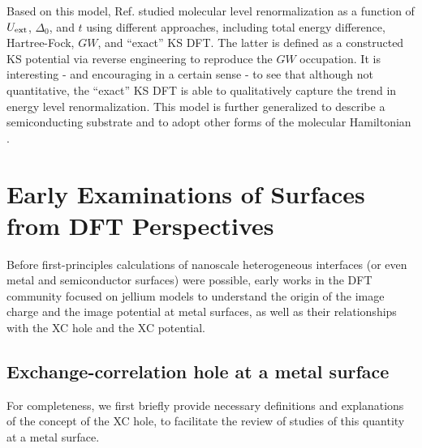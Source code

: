 \documentclass[aip, amsmath, amssymb, reprint, longbibliography]{revtex4-2}
\begin{document}
Based on this model, Ref.  studied molecular level renormalization as a function of $U_{\rm ext}$, $\Delta_0$, and $t$ using different approaches, including total energy difference, Hartree-Fock, $GW$, and ``exact'' KS DFT. The latter is defined as a constructed KS potential via reverse engineering to reproduce the $GW$ occupation. It is interesting - and encouraging in a certain sense - to see that although not quantitative, the ``exact'' KS DFT is able to qualitatively capture the trend in energy level renormalization. This model is further generalized to describe a semiconducting substrate \cite{GRRT09} and to adopt other forms of the molecular Hamiltonian \cite{ST12}.

\section{Early Examinations of Surfaces from DFT Perspectives}
\label{sec:early}

Before first-principles calculations of nanoscale heterogeneous interfaces (or even metal and semiconductor surfaces) were possible, early works in the DFT community focused on jellium models to understand the origin of the image charge and the image potential at metal surfaces, as well as their relationships with the XC hole and the XC potential.

\subsection{Exchange-correlation hole at a metal surface}
\label{sec:xchole}
For completeness, we first briefly provide necessary definitions and explanations of the concept of the XC hole, to facilitate the review of studies of this quantity at a metal surface.
\end{document}
